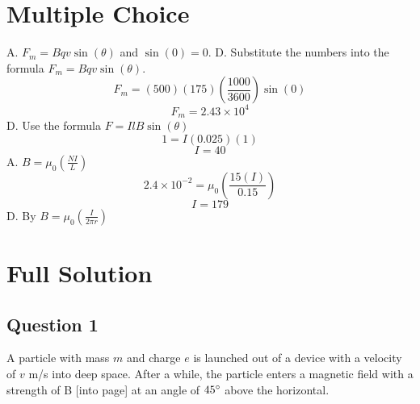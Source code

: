 \documentclass[letter,12pt]{exam}
\begin{document}
\begin{center}
\end{center}

\section{Multiple Choice}

\begin{questions}
	\question A. $F_m=Bqv\sin(\theta)$ and $\sin(0)=0$.
	\question D. Substitute the numbers into the formula $F_m=Bqv\sin(\theta)$.
		$$F_m=(500)(175)(\frac{1000}{3600})\sin(0)$$
		$$F_m=2.43\times10^4$$
	\question D. Use the formula $F=IlB\sin(\theta)$
		$$1=I(0.025)(1)$$
		$$I=40$$
	\question A. $B=\mu_0(\frac{NI}{L})$
		$$2.4 \times 10^{-2}=\mu_0(\frac{15(I)}{0.15})$$
		$$I=179$$
	\question D. By $B=\mu_0(\frac{I}{2\pi r})$
		
\end{questions}

\section{Full Solution}

\subsection{Question 1}

A particle with mass $m$ and charge $e$ is launched out of a device with a velocity of $v$ m/s into deep space. After a while, the particle enters a magnetic field with a strength of B [into page] at an angle of $45 \degree$ above the horizontal.
\end{document}
